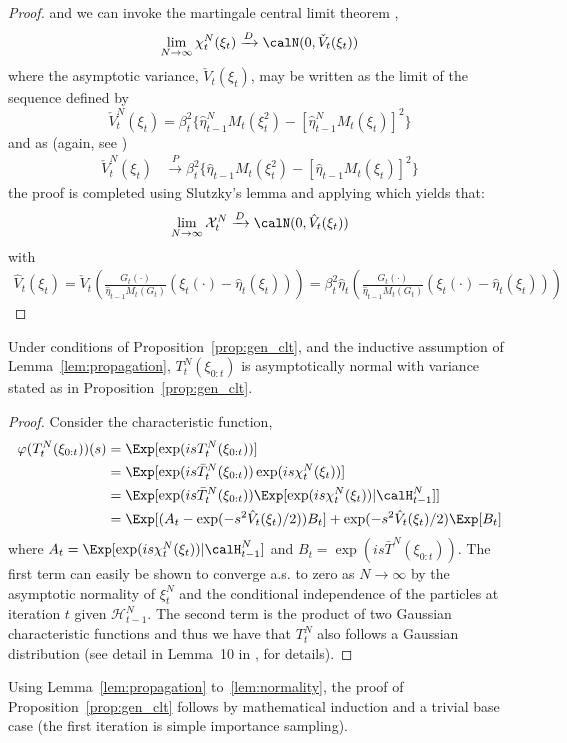 \begin{proof}
  and we can invoke the martingale central
  limit theorem \cite[pp.~543]{Shiryaev:1995vp},
  \begin{equation}
    \lim_{N \to\infty}\chi_t^N(\xi_t)%
    \xrightarrow{D}\calN(0,\check{V}_t(\xi_t))
  \end{equation}
  where the asymptotic variance, $\check{V}_t(\xi_t)$, may be written as the limit
  of the sequence defined by
  \begin{equation}
    \check{V}_t^N(\xi_t) = \beta_t^2 \{\hat\eta_{t-1}^N M_t (\xi_t^2) -
      [\hat\eta_{t-1}^NM_t(\xi_t)]^2\}
  \end{equation}
  and as (again, see \cite[Section 7.4]{DelMoral:2004ux})
  \begin{align*}
    \check{V}_t^N(\xi_t)
    &\xrightarrow{P} \beta_t^2 \{\hat\eta_{t-1}M_t(\xi_t^2) -
      [\hat\eta_{t-1}M_t(\xi_t)]^2\}
  \end{align*}
  the proof is completed using Slutzky's lemma and applying \cite[Lemma A2]{Chopin:2004cn} which
  yields that:
\begin{align*}
\lim_{N \rightarrow \infty} \mathcal{X}_t^N \xrightarrow{D} \calN(0,\hat{V}_t(\xi_t))
\end{align*}
with
\begin{align*}
\hat{V}_t(\xi_t) =
\check{V}_t\left(\frac{G_t(\cdot)}{\hat\eta_{t-1}M_t(G_t)} (\xi_t(\cdot) -
\hat\eta_t(\xi_t)) \right) =
\beta_t^2 \hat\eta_t\left(
\frac{G_t(\cdot)}{\hat\eta_{t-1}M_t(G_t)} (\xi_t(\cdot) -
\hat\eta_t(\xi_t))
\right)
\end{align*}
\end{proof}

\begin{lemma}\label{lem:normality}
  Under conditions of Proposition~\ref{prop:gen_clt}, and the inductive
  assumption of Lemma~\ref{lem:propagation}, $T_t^N(\xi_{0:t})$ is
  asymptotically normal with variance stated as in
  Proposition~\ref{prop:gen_clt}.
\end{lemma}

\begin{proof}
  Consider the characteristic function,
  \begin{align*}
    \varphi(T_t^N(\xi_{0:t}))(s)
    &= \Exp[\exp(isT_t^N(\xi_{0:t}))] \\
    &= \Exp[\exp(is\bar{T}_t^N(\xi_{0:t}))\exp(is\chi_t^N(\xi_t))] \\
    &= \Exp[\exp(is\bar{T}_t^N(\xi_{0:t}))
    \Exp[\exp(is\chi_t^N(\xi_t))|\calH_{t-1}^N]] \\
    &= \Exp[(A_t - \exp(-s^2\hat{V}_t(\xi_t)/2))B_t]
    +\exp(-s^2\hat{V}_t(\xi_t)/2)\Exp[B_t]
  \end{align*}
  where $A_t = \Exp[\exp(is\chi_t^N(\xi_t))|\calH_{t-1}^N]$ and $B_t =
  \exp(is\bar{T}^N(\xi_{0:t}))$. The first term can easily be shown to
  converge a.s. to zero as $N\to\infty$ by the asymptotic normality of
  $\xi_t^N$ and the conditional independence of the particles at iteration $t$
  given $\mathcal{H}_{t-1}^N$. The second term is the product of two Gaussian
  characteristic functions and thus we have that $T_t^N$ also follows a
  Gaussian distribution (see detail in Lemma~10{} in \cite{Johansen:2006iv},
  for details).
\end{proof}

Using Lemma~\ref{lem:propagation} to~\ref{lem:normality}, the proof of
Proposition~\ref{prop:gen_clt} follows by mathematical induction and a trivial
base case (the first iteration is simple importance sampling).
